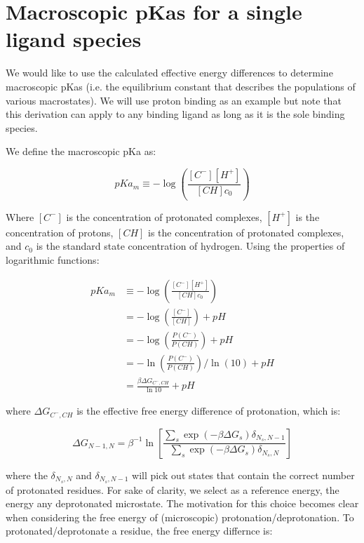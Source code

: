 \section{Macroscopic pKas for a single ligand species}

We would like to use the calculated effective energy differences to
determine macroscopic pKas (i.e. the equilibrium constant that
describes the populations of various macrostates). We will use proton
binding as an example but note that this derivation can apply to any
binding ligand as long as it is the sole binding species.

We define the macroscopic pKa as:

\begin{equation}
  pKa_m \equiv -\log \left(\frac{[C^-][H^+]}{[CH] c_0} \right)
\end{equation}

Where $[C^-]$ is the concentration of protonated complexes, $[H^+]$ is
the concentration of protons, $[CH]$ is the concentration of
protonated complexes, and $c_0$ is the standard state concentration of
hydrogen. Using the properties of logarithmic functions:

\begin{align*}
  pKa_m &\equiv -\log \left(\frac{[C^-][H^+]}{[CH] c_0} \right) \\
  &= -\log \left( \frac{[C^-]}{[CH]} \right) + pH \\
  &= -\log \left(\frac{P(C^-)}{P(CH)} \right) + pH \\
  &= -\ln \left( \frac{P(C^-)}{P(CH)} \right)/\ln(10) + pH \\
  &= \frac{\beta \Delta G_{C^-,CH}}{\ln 10} + pH
\end{align*}

where $\Delta G_{C^-,CH}$ is the effective free energy difference of
protonation, which is: 

\begin{equation}
\Delta G_{N-1,N} = \beta^{-1} \ln \left[ \frac{\sum_s \exp(-\beta
    \Delta G_s)\delta_{N_s,N-1}}{\sum_s \exp(-\beta \Delta
    G_s)\delta_{N_s,N}} \right]
\label{macrostateenergydiff}
\end{equation}

where the $\delta_{N_s,N}$ and $\delta_{N_s,N-1}$ will pick out states
that contain the correct number of protonated residues. For sake of
clarity, we select as a reference energy, the energy any deprotonated
microstate. The motivation for this choice becomes clear when
considering the free energy of (microscopic)
protonation/deprotonation. To protonated/deprotonate a residue, the free energy differnce is:

